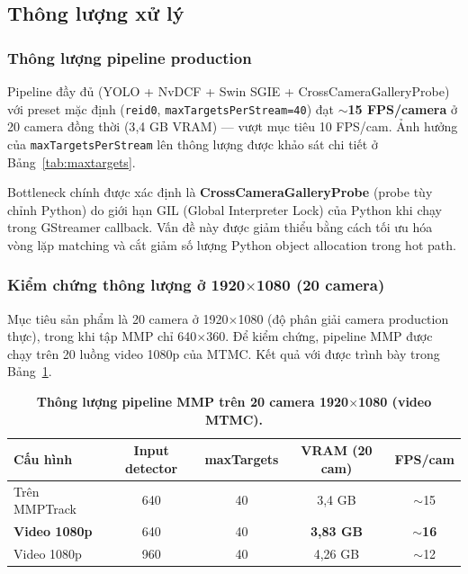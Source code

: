 \documentclass{article} %
\begin{document}
\subsection{Thông lượng xử lý}
\label{sec:throughput}

\subsubsection{Thông lượng pipeline production}

Pipeline đầy đủ (YOLO + NvDCF + Swin SGIE + CrossCameraGalleryProbe) với preset mặc định (\texttt{reid0}, \texttt{maxTargetsPerStream=40}) đạt \textbf{$\sim$15 FPS/camera} ở 20 camera đồng thời (3{,}4 GB VRAM) --- vượt mục tiêu 10 FPS/cam. Ảnh hưởng của \texttt{maxTargetsPerStream} lên thông lượng được khảo sát chi tiết ở Bảng~\ref{tab:maxtargets}.

Bottleneck chính được xác định là \textbf{CrossCameraGalleryProbe} (probe tùy chỉnh Python) do giới hạn GIL (Global Interpreter Lock) của Python khi chạy trong GStreamer callback. Vấn đề này được giảm thiểu bằng cách tối ưu hóa vòng lặp matching và cắt giảm số lượng Python object allocation trong hot path.

\subsubsection{Kiểm chứng thông lượng ở 1920$\times$1080 (20 camera)}
\label{sec:throughput_1080p}

Mục tiêu sản phẩm là 20 camera ở 1920$\times$1080 (độ phân giải camera production thực), trong khi tập MMP chỉ 640$\times$360. Để kiểm chứng, pipeline MMP được chạy trên 20 luồng video 1080p của MTMC. Kết quả với được trình bày trong Bảng~\ref{tab:throughput_1080p}.

\begin{table}[H]
    \centering
    \caption[Thông lượng pipeline MMP ở 1080p, 20 camera]{\bfseries\fontsize{12pt}{0pt}\selectfont Thông lượng pipeline MMP trên 20 camera 1920$\times$1080 (video MTMC).}
    \begin{tabular}{|l|c|c|c|c|}
    \hline
    \bfseries Cấu hình & \bfseries Input detector & \bfseries maxTargets & \bfseries VRAM (20 cam) & \bfseries FPS/cam \\
    \hline
    Trên MMPTrack & 640 & 40 & 3,4 GB & $\sim$15 \\
    \textbf{Video 1080p} & 640 & 40 & \textbf{3,83 GB} & \textbf{$\sim$16} \\
    Video 1080p & 960 & 40 & 4,26 GB & $\sim$12 \\
    \hline
    \end{tabular}
    \label{tab:throughput_1080p}
\end{table}
\end{document}
